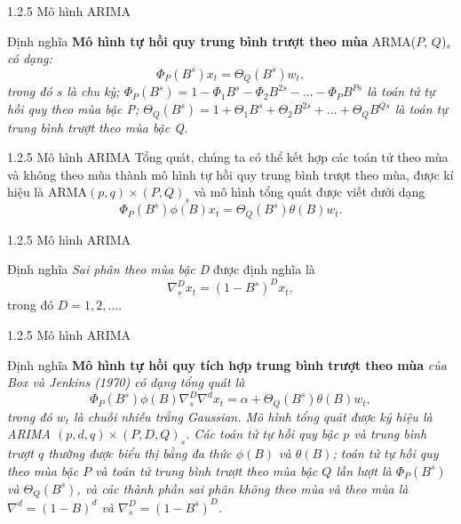 \documentclass[notheorems,envcountsect,hyperref=unicode]{beamer}
\begin{document}
\begin{frame}{1.2.5 Mô hình ARIMA}
	\begin{block}{Định nghĩa \cite{1}}
\textbf{Mô hình tự hồi quy trung bình trượt theo mùa} ARMA($P$, $Q$)$_s$ \textit{có dạng: 
	\begin{equation}
	\Phi_{P}(B^{s})x_{t}=\varTheta_{Q}(B^{s})w_{t}, \label{ct1.193}
	\end{equation}
	trong đó $ s $ là chu kỳ; $\Phi_ {P} (B^{s}) = 1- \Phi_{1}  B^{s}- \Phi_{2}  B^{2s}- \dots- \Phi_{P}  B^{Ps} \label{ct1.194} $ là toán tử tự hồi quy theo mùa bậc P; $\varTheta_{Q}(B^{s})= 1+ \varTheta_{1}B^{s} + \varTheta_{2}B^{2s}+ \dots+ \varTheta_{Q}B^{Qs} \label{ct1.195}	 $ là toán tự trung bình trượt theo mùa bậc Q.}
	\end{block}
\end{frame}

\begin{frame}{1.2.5 Mô hình ARIMA}
Tổng quát, chúng ta có thể kết hợp các toán tử theo mùa và không theo mùa thành mô hình tự hồi quy trung bình trượt theo mùa, được kí hiệu là ARMA$(p, q)\times(P, Q)_s$ và mô hình tổng quát được viết dưới dạng
\begin{equation}
\Phi_ {P} (B^{s})\phi(B)x_{t}= \varTheta_{Q}(B^{s})\theta(B)w_{t}. \label{ct1.196}
\end{equation}
\end{frame}

\begin{frame}{1.2.5 Mô hình ARIMA}
	\begin{block}{Định nghĩa \cite{1}}
\textit{Sai phân theo mùa bậc D} được định nghĩa là
\begin{equation}
\nabla_{s}^{D}x_{t}=(1-B^{s})^{D}x_{t}, \label{ct1.200}
\end{equation}
trong đó $D = 1, 2, \dots$. 
	\end{block}
\end{frame}

\begin{frame}{1.2.5 Mô hình ARIMA}
	\begin{block}{Định nghĩa \cite{1}}
\textbf{Mô hình tự hồi quy tích hợp trung bình trượt theo mùa}\textit{ của Box và Jenkins (1970) có dạng tổng quát là
	\begin{equation}
	\Phi_ {P} (B^{s})	\phi(B)\nabla_{s}^{D}\nabla^{d}x_{t}=\alpha + \varTheta_{Q}(B^{s})\theta(B)w_{t}, \label{ct1.201}
	\end{equation}	
	trong đó $w_{t}$ là chuỗi nhiễu trắng Gaussian. Mô hình tổng quát được ký hiệu là ARIMA $(p, d, q) \times (P, D, Q )_{s}$. Các toán tử tự hồi quy bậc $ p $ và trung bình trượt $ q $ thường được biểu thị bằng đa thức $\phi(B)$ và $\theta(B)$; toán tử tự hồi quy theo mùa  bậc $ P $ và toán tử trung bình trượt  theo mùa bậc $ Q $ lần lượt là $\Phi_ {P} (B^{s})$ và $\varTheta_{Q}(B^{s})$, và các thành phần sai phân không theo mùa và theo mùa là  $\nabla^{d}=(1-B)^{d}$ và $\nabla^{D}_{s}=(1-B^{s})^{D}$.} 
	\end{block}
\end{frame}
\end{document}
